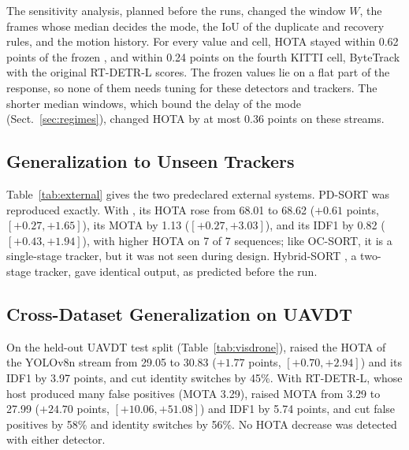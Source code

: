 The sensitivity analysis, planned before the runs, changed the window $W$, the frames whose median
decides the mode, the IoU of the duplicate and recovery rules, and the motion history. For every
value and cell, HOTA stayed within 0.62 points of the frozen \scl{}, and within 0.24 points on the
fourth KITTI cell, ByteTrack with the original RT-DETR-L scores. The frozen values lie on a flat
part of the response, so none of them needs tuning for these detectors and trackers. The shorter
median windows, which bound the delay of the mode (Sect.~\ref{sec:regimes}), changed HOTA by at most
0.36 points on these streams.


\subsection{Generalization to Unseen Trackers}\label{sec:external}
Table~\ref{tab:external} gives the two predeclared external systems. PD-SORT \cite{wang2025pdsort}
was reproduced exactly. With \scl{}, its HOTA rose from 68.01 to 68.62 ($+0.61$ points, $[+0.27,+1.65]$), its MOTA by
1.13 ($[+0.27,+3.03]$), and its IDF1 by 0.82 ($[+0.43,+1.94]$), with higher HOTA on 7 of 7
sequences; like OC-SORT, it is a single-stage tracker, but it was not seen during design.
Hybrid-SORT \cite{yang2024hybridsort}, a two-stage tracker, gave identical output, as predicted
before the run.


\subsection{Cross-Dataset Generalization on UAVDT}\label{sec:visdrone}
On the held-out UAVDT test split (Table~\ref{tab:visdrone}), \scl{} raised the HOTA of the YOLOv8n
stream from 29.05 to 30.83 ($+1.77$ points, $[+0.70,+2.94]$) and its IDF1 by 3.97 points, and cut identity switches by
45\%. With RT-DETR-L, whose host produced many false positives (MOTA 3.29), \scl{} raised MOTA from 3.29
to 27.99 ($+24.70$ points, $[+10.06,+51.08]$) and IDF1 by 5.74 points, and cut false positives by 58\% and
identity switches by 56\%. No HOTA decrease was detected with either detector.

